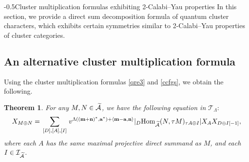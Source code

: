 \documentclass[reqno,12pt]{amsart}
\makeatletter
\numberwithin{equation}{section}
\def\lr#1{\langle #1\rangle} \def\fin{\hfill$\square$}  \def\lra{\longrightarrow} \def\mod{\mbox{\rm \textbf{mod}}\,}\def\Mod{\mbox{\rm mod}\,}\def\top{\mbox{\rm top}\,}\def\soc{\mbox{\rm soc}\,}
\theoremstyle{plain} %
\newtheorem{theorem}{\bf Theorem}[section]
\theoremstyle{definition} %
\renewcommand{\section}{\@startsection{section}{1}{0mm}
  {-\baselineskip}{0.5\baselineskip}{\bf\leftline}}
\makeatother
\begin{document}
\section{Cluster multiplication formulas exhibiting 2-Calabi--Yau properties}
In this section, we provide a direct sum decomposition formula of quantum cluster characters, which exhibits certain symmetries similar to 2-Calabi--Yau properties of cluster categories.
\subsection{An alternative cluster multiplication formula}
Using the cluster multiplication formulas \eqref{qre3} and \eqref{ccfgs}, we obtain the following.

\begin{theorem}\label{zhihe}
For any $M,N\in\widetilde{\mathcal{A}}$, we have the following equation in $\mathcal{T}_\Lambda:$
\begin{equation}\label{zhihegs}
\begin{split}
X_{M\oplus N}=\sum\limits_{\begin{smallmatrix}[D],[A],[I]\end{smallmatrix}}v^{\Lambda(({\bf m}+{\bf n})^*,{\bf a}^*)+\lr{{\bf m}-{\bf a},{\bf n}}}|_D\Hom_{\widetilde{\A}}(N,\tau M)_{\tau A\oplus I}|X_{A} X_{D\oplus I[-1]},
\end{split}\end{equation}
where each $A$ has the same maximal projective direct summand as $M$, and each $I\in\mathcal{I}_{\widetilde{\mathcal{A}}}$.
\end{theorem}
\end{document}
